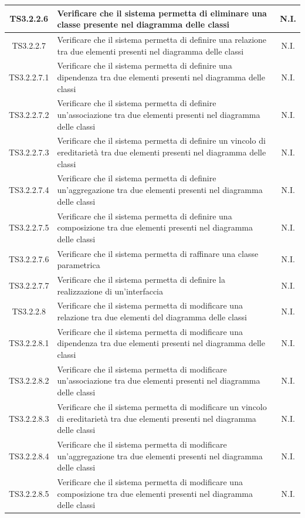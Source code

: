 \documentclass[../PianoDiQualifica.tex]{subfiles}
\begin{document}
\begin{longtable}{|c|>{\centering}p{10cm}|c|}
	\hline
	TS3.2.2.6 & Verificare che il sistema permetta di eliminare una classe presente nel diagramma delle classi & N.I. \\
	\hline
	TS3.2.2.7 & Verificare che il sistema permetta di definire una relazione tra due elementi presenti nel diagramma delle classi & N.I. \\
	\hline
	TS3.2.2.7.1 & Verificare che il sistema permetta di definire una dipendenza tra due elementi presenti nel diagramma delle classi & N.I. \\
	\hline
	TS3.2.2.7.2 & Verificare che il sistema permetta di definire un'associazione tra due elementi presenti nel diagramma delle classi & N.I. \\
	\hline
	TS3.2.2.7.3 & Verificare che il sistema permetta di definire un vincolo di ereditarietà tra due elementi presenti nel diagramma delle classi & N.I. \\
	\hline
	TS3.2.2.7.4 & Verificare che il sistema permetta di definire un'aggregazione tra due elementi presenti nel diagramma delle classi & N.I. \\
	\hline
	TS3.2.2.7.5 & Verificare che il sistema permetta di definire una composizione tra due elementi presenti nel diagramma delle classi & N.I. \\
	\hline
	TS3.2.2.7.6 & Verificare che il sistema permetta di raffinare una classe parametrica & N.I. \\
	\hline
	TS3.2.2.7.7 & Verificare che il sistema permetta di definire la realizzazione di un'interfaccia & N.I. \\
	\hline
	TS3.2.2.8 & Verificare che il sistema permetta di modificare una relazione tra due elementi del diagramma delle classi & N.I. \\
	\hline
	TS3.2.2.8.1 & Verificare che il sistema permetta di modificare una dipendenza tra due elementi presenti nel diagramma delle classi & N.I. \\
	\hline
	TS3.2.2.8.2 & Verificare che il sistema permetta di modificare un'associazione tra due elementi presenti nel diagramma delle classi & N.I. \\
	\hline
	TS3.2.2.8.3 & Verificare che il sistema permetta di modificare un vincolo di ereditarietà tra due elementi presenti nel diagramma delle classi & N.I. \\
	\hline
	TS3.2.2.8.4 & Verificare che il sistema permetta di modificare un'aggregazione tra due elementi presenti nel diagramma delle classi & N.I. \\
	\hline
	TS3.2.2.8.5 & Verificare che il sistema permetta di modificare una composizione tra due elementi presenti nel diagramma delle classi & N.I. \\

\end{longtable}
\end{document}
